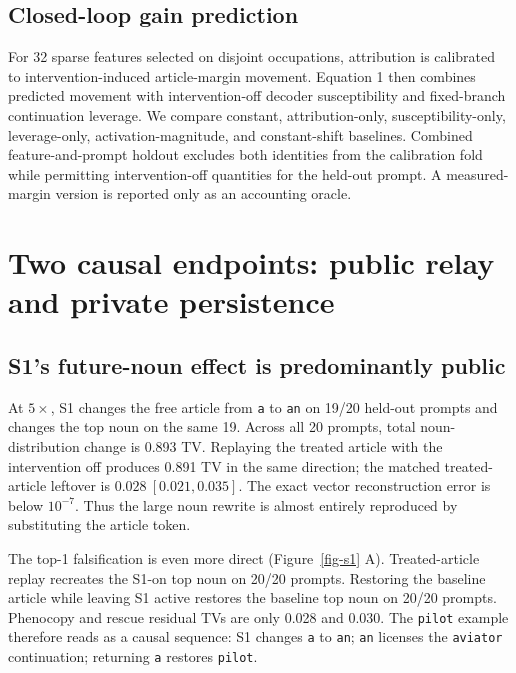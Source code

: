 \documentclass[
]{article}
\begin{document}
\subsection{Closed-loop gain
prediction}\label{closed-loop-gain-prediction}

For 32 sparse features selected on disjoint occupations, attribution is
calibrated to intervention-induced article-margin movement. Equation 1
then combines predicted movement with intervention-off decoder
susceptibility and fixed-branch continuation leverage. We compare
constant, attribution-only, susceptibility-only, leverage-only,
activation-magnitude, and constant-shift baselines. Combined
feature-and-prompt holdout excludes both identities from the calibration
fold while permitting intervention-off quantities for the held-out
prompt. A measured-margin version is reported only as an accounting
oracle.

\section{Two causal endpoints: public relay and private
persistence}\label{two-causal-endpoints-public-relay-and-private-persistence}

\subsection{S1's future-noun effect is predominantly
public}\label{s1s-future-noun-effect-is-predominantly-public}

At \(5\times\), S1 changes the free article from \texttt{a} to
\texttt{an} on 19/20 held-out prompts and changes the top noun on the
same 19. Across all 20 prompts, total noun-distribution change is 0.893
TV. Replaying the treated article with the intervention off produces
0.891 TV in the same direction; the matched treated-article leftover is
\(0.028\ [0.021,0.035]\). The exact vector reconstruction error is below
\(10^{-7}\). Thus the large noun rewrite is almost entirely reproduced
by substituting the article token.

The top-1 falsification is even more direct (Figure~\ref{fig-s1} A).
Treated-article replay recreates the S1-on top noun on 20/20 prompts.
Restoring the baseline article while leaving S1 active restores the
baseline top noun on 20/20 prompts. Phenocopy and rescue residual TVs
are only 0.028 and 0.030. The \texttt{pilot} example therefore reads as
a causal sequence: S1 changes \texttt{a} to \texttt{an}; \texttt{an}
licenses the \texttt{aviator} continuation; returning \texttt{a}
restores \texttt{pilot}.
\end{document}
